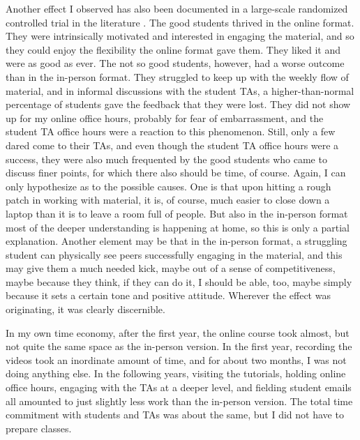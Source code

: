 \documentclass[graybox]{svmult}
\begin{document}
Another effect I observed has also been documented in a large-scale randomized controlled trial in the literature \citep{cacault2021distance}. The good students thrived in the online format. They were intrinsically motivated and interested in engaging the material, and so they could enjoy the flexibility the online format gave them. They liked it and were as good as ever. The not so good students, however, had a worse outcome than in the in-person format. They struggled to keep up with the weekly flow of material, and in informal discussions with the student TAs, a higher-than-normal percentage of students gave the feedback that they were lost. They did not show up for my online office hours, probably for fear of embarrassment, and the student TA office hours were a reaction to this phenomenon. Still, only a few dared come to their TAs, and even though the student TA office hours were a success, they were also much frequented by the good students who came to discuss finer points, for which there also should be time, of course. Again, I can only hypothesize as to the possible causes. One is that upon hitting a rough patch in working with material, it is, of course,  much easier to close down a laptop than it is to leave a room full of people. But also in the in-person format most of the deeper understanding is happening at home, so this is only a partial explanation. Another element may be that in the in-person format, a struggling student can physically see peers successfully engaging in the material, and this may give them a much needed kick, maybe out of a sense of competitiveness, maybe because they think, if they can do it, I should be able, too, maybe simply because it sets a certain tone and positive attitude. Wherever the effect was originating, it was clearly discernible.

In my own time economy, after the first year, the online course took almost, but not quite the same space as the in-person version. In the first year, recording the videos took an inordinate amount of time, and for about two months, I was not doing anything else. In the following years, visiting the tutorials, holding online office hours, engaging with the TAs at a deeper level, and fielding student emails all amounted to just slightly less work than the in-person version. The total time commitment with students and TAs was about the same, but I did not have to prepare classes.
\end{document}
